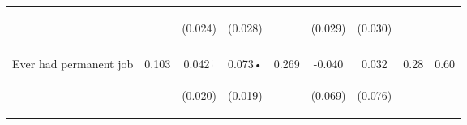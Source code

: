 \begin{tabular}{lcccccccc}
 & \begin{footnotesize}\end{footnotesize} & \begin{footnotesize}(0.024)\end{footnotesize} & \begin{footnotesize}(0.028)\end{footnotesize} & \begin{footnotesize}\end{footnotesize} & \begin{footnotesize}(0.029)\end{footnotesize} & \begin{footnotesize}(0.030)\end{footnotesize} & \begin{footnotesize}\end{footnotesize} & \begin{footnotesize}\end{footnotesize}\\
 & \begin{footnotesize}\end{footnotesize} & \begin{footnotesize}[0.076]\end{footnotesize} & \begin{footnotesize}[0.003]\end{footnotesize} & \begin{footnotesize}\end{footnotesize} & \begin{footnotesize}[1.000]\end{footnotesize} & \begin{footnotesize}[0.087]\end{footnotesize} & \begin{footnotesize}\end{footnotesize} & \begin{footnotesize}\end{footnotesize}\\
\noalign{\smallskip}Ever had permanent job & 0.103 & 0.042† & 0.073• & 0.269 & -0.040 & 0.032 & 0.28 & 0.60\\
 & \begin{footnotesize}\end{footnotesize} & \begin{footnotesize}(0.020)\end{footnotesize} & \begin{footnotesize}(0.019)\end{footnotesize} & \begin{footnotesize}\end{footnotesize} & \begin{footnotesize}(0.069)\end{footnotesize} & \begin{footnotesize}(0.076)\end{footnotesize} & \begin{footnotesize}\end{footnotesize} & \begin{footnotesize}\end{footnotesize}\\

\end{tabular}

